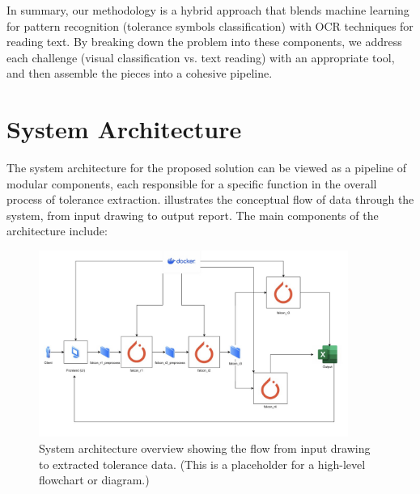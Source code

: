 \documentclass[11pt,a4paper]{article}
\begin{document}
In summary, our methodology is a hybrid approach that blends machine learning for pattern recognition (tolerance symbols classification) with OCR techniques for reading text. By breaking down the problem into these components, we address each challenge (visual classification vs. text reading) with an appropriate tool, and then assemble the pieces into a cohesive pipeline.

\section{System Architecture}
The system architecture for the proposed solution can be viewed as a pipeline of modular components, each responsible for a specific function in the overall process of tolerance extraction. illustrates the conceptual flow of data through the system, from input drawing to output report. The main components of the architecture include:
\begin{figure}[h!]
\centering
\includegraphics[width=0.9\textwidth]{System Archi.png}
\caption{System architecture overview showing the flow from input drawing to extracted tolerance data. (This is a placeholder for a high-level flowchart or diagram.)}
\label{fig:Arch_Flow}
\end{figure}
\end{document}
